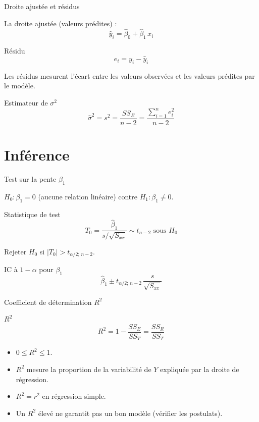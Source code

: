 \documentclass{BeamerTemplate}
\begin{document}
\begin{frame}[t]{Droite ajustée et résidus}

La droite ajustée (valeurs prédites) :
$$\hat{y}_i = \hat{\beta}_0 + \hat{\beta}_1\, x_i$$

\begin{Boite}{Résidu}
$$e_i = y_i - \hat{y}_i$$
\end{Boite}

\medskip
Les résidus mesurent l'écart entre les valeurs observées et les valeurs prédites par le modèle.

\bigskip
\begin{Boite}{Estimateur de $\sigma^2$}
$$\hat{\sigma}^2 = s^2 = \frac{SS_E}{n-2} = \frac{\displaystyle\sum_{i=1}^n e_i^2}{n-2}$$
\end{Boite}

\end{frame}

\section{Inférence}

\begin{frame}[t]{Test sur la pente $\beta_1$}

$H_0 : \beta_1 = 0$ (aucune relation linéaire) contre $H_1 : \beta_1 \ne 0$.

\bigskip
\begin{Boite}{Statistique de test}
$$T_0 = \frac{\hat{\beta}_1}{s/\sqrt{S_{xx}}} \sim t_{n-2} \text{ sous } H_0$$
\end{Boite}

\medskip
Rejeter $H_0$ si $|T_0| > t_{\alpha/2;\,n-2}$.

\bigskip
\begin{Boite}{IC à $1-\alpha$ pour $\beta_1$}
$$\hat{\beta}_1 \pm t_{\alpha/2;\,n-2}\,\frac{s}{\sqrt{S_{xx}}}$$
\end{Boite}

\end{frame}

\begin{frame}[t]{Coefficient de détermination $R^2$}

\begin{Boite}{$R^2$}
$$R^2 = 1 - \frac{SS_E}{SS_T} = \frac{SS_R}{SS_T}$$
\end{Boite}

\medskip
\begin{itemize}\itemsep4mm
  \item $0 \le R^2 \le 1$.
  \item $R^2$ mesure la \alert{proportion de la variabilité de $Y$ expliquée} par la droite de régression.
  \item $R^2 = r^2$ en régression simple.
  \item Un $R^2$ élevé ne garantit pas un bon modèle (vérifier les postulats).
\end{itemize}

\end{frame}
\end{document}
